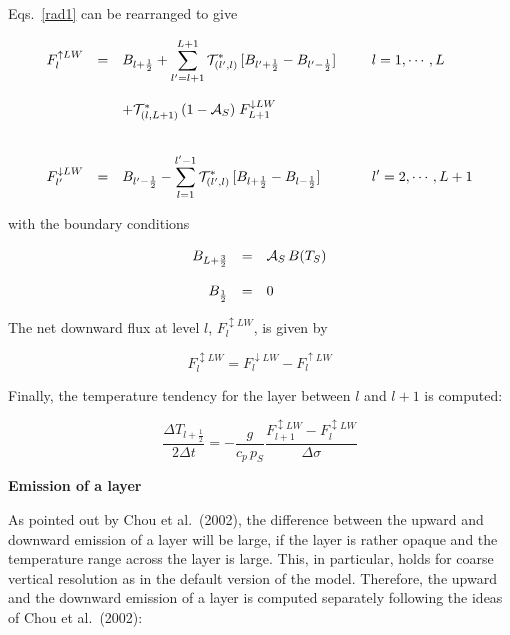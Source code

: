 Eqs.~\ref{rad1} can be rearranged to give

\begin{equation}\label{vertical1}
\begin{array}{rclcl}
\displaystyle F_l^{\uparrow LW}& = &\displaystyle  B_{l+\frac{1}{2}} + 
\sum\limits_{l^\prime=l+1}^{L+1} {\cal T}^*_{(l^\prime ,
l)} \,
[B_{l^\prime+\frac{1}{2}} - B_{l^\prime-
\frac{1}{2}}] &  & \displaystyle \;\; l=1,  \cdots , L\\
&&&&\\
 & & + {\cal T}^*_{(l,L+1)} \, (1-{\cal A}_S) \; F_{L+1}^{\downarrow LW} & & \\
& & & &  \\
&&&&\\
\displaystyle F_{l^\prime}^{\downarrow LW}& = & \displaystyle
B_{l^\prime-
\frac{1}{2}} - \sum\limits_{l=1}^{l^\prime-1}{\cal T}^*_{(l^\prime , l)} \,
[B_{l+\frac{1}{2}} -
B_{l-\frac{1}{2}}]
& & \displaystyle \;\; l^\prime=2,  \cdots , L+1
\end{array}
\end{equation}

with the boundary conditions

\begin{equation}
\begin{array}{rcl}
\displaystyle B_{L+\frac{3}{2}}& = & \displaystyle {\cal A}_S \,
B(T_S) \\
&&\\
\displaystyle B_{\frac{1}{2}} & = & \displaystyle 0
\end{array}
\end{equation}

The net downward flux at
level
$l$, $F_l^{\updownarrow LW}$, is given by

\begin{equation}
F_l^{\updownarrow LW}=F_l^{\downarrow LW}-F_l^{\uparrow LW}
\end{equation}

Finally, the temperature tendency for the layer between
$l$ and $l+1$ is computed:

\begin{equation}
\frac{\Delta T_{l+\frac{1}{2}}}{2\Delta t} = -
\frac{g}{c_p
\, p_S}\frac{F_{l+1}^{\updownarrow LW}-F_{l}^{\updownarrow LW}}{\Delta
\sigma}   
\end{equation}

{\bf Emission of a layer}

As pointed out by Chou et al.~(2002), the difference between the upward and downward
emission of a layer will be large, if the layer is rather opaque and the temperature range across
the layer is large. This, in particular, holds for coarse vertical resolution as in the default version
of the model. Therefore, the upward and the downward emission of a layer is computed
separately following the ideas of Chou et al.~(2002):

